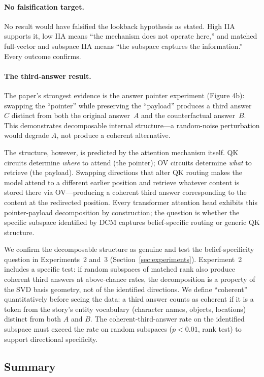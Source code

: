 \documentclass{article}
\begin{document}
\paragraph{No falsification target.}
No result would have falsified the lookback hypothesis as stated. High IIA supports it, low IIA means ``the mechanism does not operate here,'' and matched full-vector and subspace IIA means ``the subspace captures the information.'' Every outcome confirms.

\paragraph{The third-answer result.}
The paper's strongest evidence is the answer pointer experiment (Figure 4b): swapping the ``pointer'' while preserving the ``payload'' produces a third answer~$C$ distinct from both the original answer~$A$ and the counterfactual answer~$B$. This demonstrates decomposable internal structure---a random-noise perturbation would degrade $A$, not produce a coherent alternative.

The structure, however, is predicted by the attention mechanism itself. QK circuits determine \emph{where} to attend (the pointer); OV circuits determine \emph{what} to retrieve (the payload). Swapping directions that alter QK routing makes the model attend to a different earlier position and retrieve whatever content is stored there via OV---producing a coherent third answer corresponding to the content at the redirected position. Every transformer attention head exhibits this pointer-payload decomposition by construction; the question is whether the specific subspace identified by DCM captures belief-specific routing or generic QK structure.

We confirm the decomposable structure as genuine and test the belief-specificity question in Experiments~2 and~3 (Section~\ref{sec:experiments}). Experiment~2 includes a specific test: if random subspaces of matched rank also produce coherent third answers at above-chance rates, the decomposition is a property of the SVD basis geometry, not of the identified directions. We define ``coherent'' quantitatively before seeing the data: a third answer counts as coherent if it is a token from the story's entity vocabulary (character names, objects, locations) distinct from both $A$ and $B$. The coherent-third-answer rate on the identified subspace must exceed the rate on random subspaces ($p < 0.01$, rank test) to support directional specificity.

\subsection{Summary}
\end{document}
